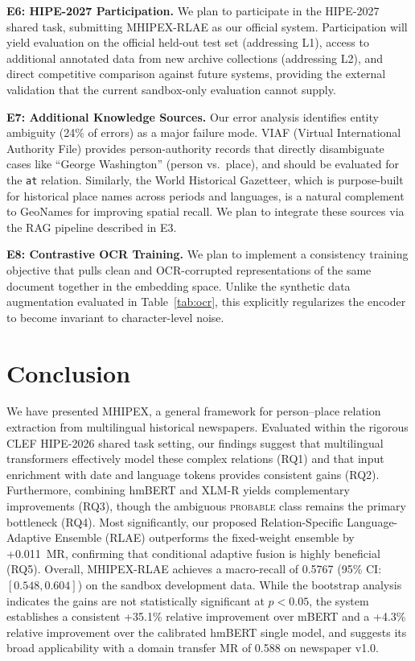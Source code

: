 \documentclass[11pt,a4paper]{article}
\begin{document}
\textbf{E6: HIPE-2027 Participation.} We plan to participate in the HIPE-2027 shared task, submitting MHIPEX-RLAE as our official system. Participation will yield evaluation on the official held-out test set (addressing L1), access to additional annotated data from new archive collections (addressing L2), and direct competitive comparison against future systems, providing the external validation that the current sandbox-only evaluation cannot supply.

\textbf{E7: Additional Knowledge Sources.} Our error analysis identifies entity ambiguity (24\% of errors) as a major failure mode. VIAF (Virtual International Authority File) provides person-authority records that directly disambiguate cases like ``George Washington'' (person vs.\ place), and should be evaluated for the \texttt{at} relation. Similarly, the World Historical Gazetteer, which is purpose-built for historical place names across periods and languages, is a natural complement to GeoNames for improving spatial recall. We plan to integrate these sources via the RAG pipeline described in E3.

\textbf{E8: Contrastive OCR Training.} We plan to implement a consistency training objective that pulls clean and OCR-corrupted representations of the same document together in the embedding space. Unlike the synthetic data augmentation evaluated in Table~\ref{tab:ocr}, this explicitly regularizes the encoder to become invariant to character-level noise.

\section{Conclusion}
\label{sec:conclusion}

We have presented MHIPEX, a general framework for person--place relation extraction from multilingual historical newspapers. Evaluated within the rigorous CLEF HIPE-2026 shared task setting, our findings suggest that multilingual transformers effectively model these complex relations (RQ1) and that input enrichment with date and language tokens provides consistent gains (RQ2). Furthermore, combining hmBERT and XLM-R yields complementary improvements (RQ3), though the ambiguous \textsc{probable} class remains the primary bottleneck (RQ4). Most significantly, our proposed Relation-Specific Language-Adaptive Ensemble (RLAE) outperforms the fixed-weight ensemble by +0.011~MR, confirming that conditional adaptive fusion is highly beneficial (RQ5). Overall, MHIPEX-RLAE achieves a macro-recall of 0.5767 (95\% CI: $[0.548, 0.604]$) on the sandbox development data. While the bootstrap analysis indicates the gains are not statistically significant at $p<0.05$, the system establishes a consistent +35.1\% relative improvement over mBERT and a +4.3\% relative improvement over the calibrated hmBERT single model, and suggests its broad applicability with a domain transfer MR of 0.588 on newspaper v1.0.
\end{document}
